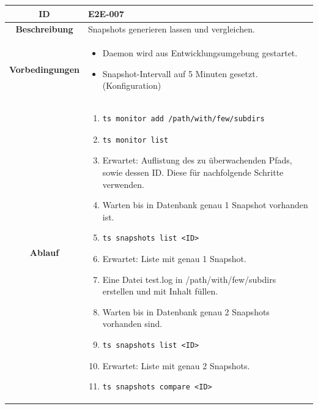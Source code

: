 \documentclass[a4paper,12pt]{report}
\begin{document}
    \begin{table}[h!]
        \centering
        \setlength{\leftmargini}{0.8cm}
        \begin{tabular}{|c|p{10cm}|}
            \hline
            \textbf{ID}           & E2E-007 \\ \hline
            \textbf{Beschreibung} & Snapshots generieren lassen und vergleichen. \\ \hline
            \textbf{Vorbedingungen} &
            \begin{itemize}
                \item Daemon wird aus Entwicklungsumgebung gestartet.
                \item Snapshot-Intervall auf 5 Minuten gesetzt. (Konfiguration)
            \end{itemize} \\ \hline
            \textbf{Ablauf} &
            \begin{enumerate}
                \item \begin{verbatim}ts monitor add /path/with/few/subdirs\end{verbatim}
                \item \begin{verbatim}ts monitor list\end{verbatim}
                \item Erwartet: Auflistung des zu überwachenden Pfads, sowie dessen ID. Diese für nachfolgende Schritte verwenden.
                \item Warten bis in Datenbank genau 1 Snapshot vorhanden ist.
                \item \begin{verbatim}ts snapshots list <ID>\end{verbatim}
                \item Erwartet: Liste mit genau 1 Snapshot.
                \item Eine Datei test.log in /path/with/few/subdirs erstellen und mit Inhalt füllen.
                \item Warten bis in Datenbank genau 2 Snapshots vorhanden sind.
                \item \begin{verbatim}ts snapshots list <ID>\end{verbatim}
                \item Erwartet: Liste mit genau 2 Snapshots.
                \item \begin{verbatim}ts snapshots compare <ID>\end{verbatim}

\end{enumerate}
\end{tabular}
\end{table}
\end{document}
